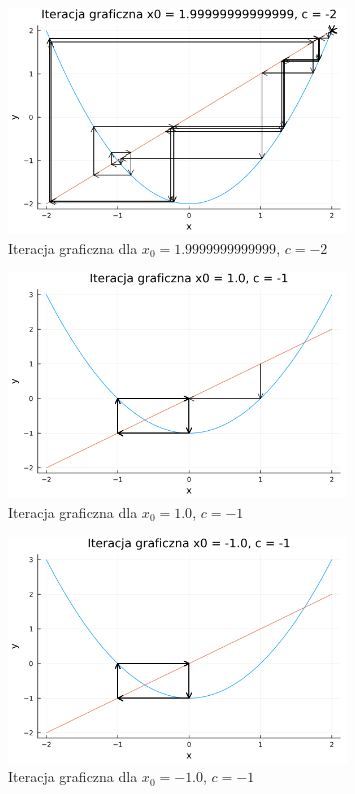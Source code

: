 \documentclass{article}
\begin{document}
\begin{figure}[H]
  \centering
  \includegraphics[width=0.8\textwidth]{../images/ex6_3.png}
  \caption{Iteracja graficzna dla $x_0=1.9999999999999$, $c=-2$}
\end{figure}
\begin{figure}[H]
  \centering
  \includegraphics[width=0.8\textwidth]{../images/ex6_4.png}
  \caption{Iteracja graficzna dla $x_0=1.0$, $c=-1$}
\end{figure}
\begin{figure}[H]
  \centering
  \includegraphics[width=0.8\textwidth]{../images/ex6_5.png}
  \caption{Iteracja graficzna dla $x_0=-1.0$, $c=-1$}
\end{figure}
\end{document}
